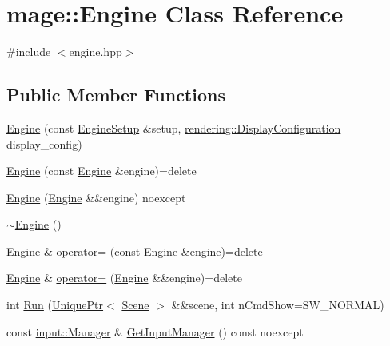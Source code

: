 \hypertarget{classmage_1_1_engine}{}\section{mage\+:\+:Engine Class Reference}
\label{classmage_1_1_engine}


{\ttfamily \#include $<$engine.\+hpp$>$}

\subsection*{Public Member Functions}
\begin{DoxyCompactItemize}
\item 
\mbox{\hyperlink{classmage_1_1_engine_a0bc870c6e4f9418bcce548aa5ef6626b}{Engine}} (const \mbox{\hyperlink{classmage_1_1_engine_setup}{Engine\+Setup}} \&setup, \mbox{\hyperlink{classmage_1_1rendering_1_1_display_configuration}{rendering\+::\+Display\+Configuration}} display\+\_\+config)
\item 
\mbox{\hyperlink{classmage_1_1_engine_afd2f4f32b2e803f59521aafe1924f0ba}{Engine}} (const \mbox{\hyperlink{classmage_1_1_engine}{Engine}} \&engine)=delete
\item 
\mbox{\hyperlink{classmage_1_1_engine_a91a51a60109b49d6e322c299147e1312}{Engine}} (\mbox{\hyperlink{classmage_1_1_engine}{Engine}} \&\&engine) noexcept
\item 
\mbox{\hyperlink{classmage_1_1_engine_a34628556f8397d70ed018d71e343c2f5}{$\sim$\+Engine}} ()
\item 
\mbox{\hyperlink{classmage_1_1_engine}{Engine}} \& \mbox{\hyperlink{classmage_1_1_engine_a1eedff82d4c8207c61676230520648fd}{operator=}} (const \mbox{\hyperlink{classmage_1_1_engine}{Engine}} \&engine)=delete
\item 
\mbox{\hyperlink{classmage_1_1_engine}{Engine}} \& \mbox{\hyperlink{classmage_1_1_engine_a22607a263e0be5e179cc0e4bf13b18f7}{operator=}} (\mbox{\hyperlink{classmage_1_1_engine}{Engine}} \&\&engine)=delete
\item 
int \mbox{\hyperlink{classmage_1_1_engine_a4ad554bca1ac892e1274f2e707c2a017}{Run}} (\mbox{\hyperlink{namespacemage_a3316d7143a973e37adf1110f2e80ca31}{Unique\+Ptr}}$<$ \mbox{\hyperlink{classmage_1_1_scene}{Scene}} $>$ \&\&scene, int n\+Cmd\+Show=S\+W\+\_\+\+N\+O\+R\+M\+AL)
\item 
const \mbox{\hyperlink{classmage_1_1input_1_1_manager}{input\+::\+Manager}} \& \mbox{\hyperlink{classmage_1_1_engine_ae5b542540511190eb6d284bf3e6ab54c}{Get\+Input\+Manager}} () const noexcept

\end{DoxyCompactItemize}
